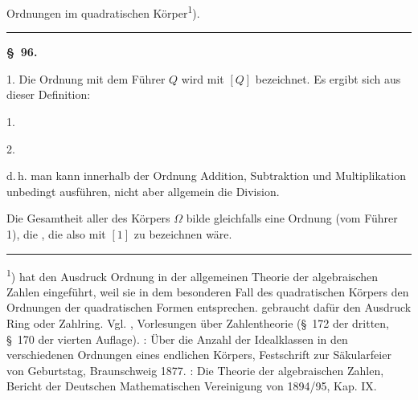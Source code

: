 
\begin{center}

Ordnungen im quadratischen Körper\textsuperscript{1}).
\end{center}

\rule{3cm}{0.4pt}

\begin{center}
\textbf{\S\ 96. }
\end{center}

1.  Die Ordnung mit dem Führer $Q$ wird mit $[Q]$ bezeichnet. Es ergibt sich aus dieser Definition:

1. 

2. 

d.\,h. man kann innerhalb der Ordnung Addition, Subtraktion und Multiplikation unbedingt ausführen, nicht aber allgemein die Division.

Die Gesamtheit aller  des Körpers $\Omega$ bilde gleichfalls eine Ordnung (vom Führer 1), die , die also mit $[1]$ zu bezeichnen wäre.

\rule{4cm}{0.4pt}

\textsuperscript{1})  hat den Ausdruck Ordnung in der allgemeinen Theorie der algebraischen Zahlen eingeführt, weil sie in dem besonderen Fall des quadratischen Körpers den  Ordnungen der quadratischen Formen entsprechen.  gebraucht dafür den Ausdruck \glqq Ring\grqq{} oder \glqq Zahlring\grqq{}. Vgl. , Vorlesungen über Zahlentheorie (\S\ 172 der dritten, \S\ 170 der vierten Auflage). : Über die Anzahl der Idealklassen in den verschiedenen Ordnungen eines endlichen Körpers, Festschrift zur Säkularfeier von  Geburtstag, Braunschweig 1877. : Die Theorie der algebraischen Zahlen, Bericht der Deutschen Mathematischen Vereinigung von 1894/95, Kap. IX.
